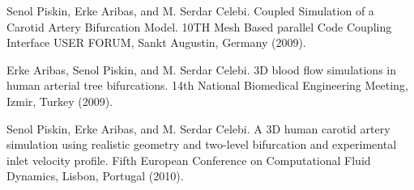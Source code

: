 
\begin{thebibliography}{10}
{\sc Senol Piskin, Erke Aribas, and M. Serdar Celebi}. {Coupled Simulation of a Carotid Artery Bifurcation Model}. 10TH Mesh Based parallel Code Coupling Interface USER FORUM, Sankt Augustin, Germany (2009).

{\sc Erke Aribas, Senol Piskin, and M. Serdar Celebi}. {3D blood flow simulations in human arterial tree bifurcations}. 14th National Biomedical Engineering Meeting, Izmir, Turkey (2009).

{\sc Senol Piskin, Erke Aribas, and M. Serdar Celebi}. {A 3D human carotid artery simulation using realistic geometry and two-level bifurcation and  experimental inlet velocity profile}. Fifth European Conference on Computational Fluid Dynamics, Lisbon, Portugal (2010).
\end{thebibliography}